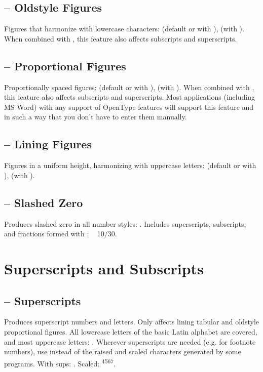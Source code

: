 \subsection{ -- Oldstyle
Figures}
Figures that harmonize with lowercase characters:  (default or with
), 
(with ). When combined with , this feature also affects subscripts
and superscripts.

\subsection{ --
Proportional Figures}
Proportionally spaced figures:  (default or with ),
 (with
). When combined with , this feature also affects subscripts and
superscripts. Most applications (including MS Word) with any support of OpenType features will support this feature and
 in such a way that you don't have to enter them manually.

\subsection{ -- Lining
Figures}
Figures in a uniform height, harmonizing with uppercase letters:  (default or with
),  (with ).

\subsection{ -- Slashed Zero}
Produces slashed zero in all number styles:
{   . Includes superscripts, subscripts, and
fractions formed with :
~  10/30}.\pagebreak

\section{Superscripts and Subscripts}
\subsection{ -- Superscripts}
Produces superscript numbers and letters. Only affects lining tabular and oldstyle proportional figures. All lowercase
letters of the basic Latin alphabet are covered, and most uppercase letters: . Wherever
superscripts are needed (e.g. for footnote numbers), use  instead of the raised and scaled
characters generated by some programs. With sups: . Scaled: \textsuperscript{4567}.

